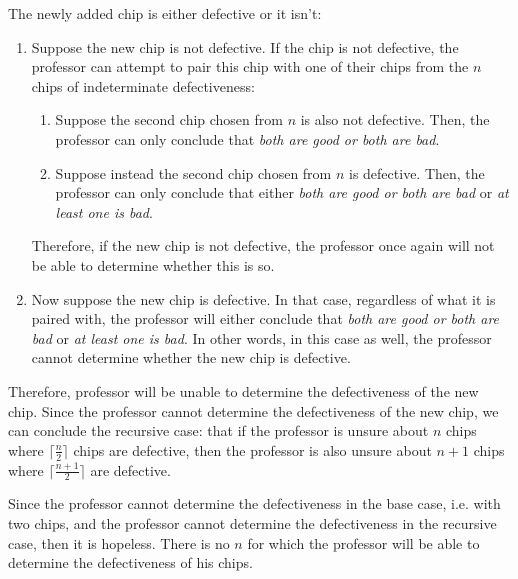 \documentclass[]{book}
\theoremstyle{definition}
\begin{document}
\begin{enumerate}[label=\alph*.]
\begin{itemize}
        The newly added chip is either defective or it isn't:
        \begin{enumerate}
            \item
            Suppose the new chip is not defective.
            If the chip is not defective, the professor can attempt to pair this chip with one of their
            chips from the $n$ chips of indeterminate defectiveness:
            \begin{enumerate}
                \item Suppose the second chip chosen from $n$ is also not defective. Then, the professor can
                only conclude that 
                \textit{both are good or both are bad}.
                \item Suppose instead the second chip chosen from $n$ is defective. Then, the professor can
                only conclude that either \textit{both are good or both are bad} or \textit{at least one is bad}.
            \end{enumerate}

            Therefore, if the new chip is not defective, the professor once again will not be able to determine
            whether this is so.

            \item Now suppose the new chip is defective. In that case, regardless of what it is paired with,
            the professor will either conclude that 
            \textit{both are good or both are bad} or \textit{at least one is bad}.
            In other words, in this case as well, the professor cannot determine whether the new chip
            is defective.
        \end{enumerate}

        Therefore, professor will be unable to determine the defectiveness of the new chip.
        Since the professor cannot determine the defectiveness of the new chip, we can conclude
        the recursive case: that if the professor is unsure about $n$ chips where 
        $\lceil \frac{n}{2} \rceil$ chips are defective, 
        then the professor is also unsure about $n+1$ chips 
        where $\lceil \frac{n+1}{2} \rceil$ are defective.
    
    \end{itemize}

    Since the professor cannot determine the defectiveness in the base case, i.e. with two chips,
    and the professor cannot determine the defectiveness in the recursive case, then it is hopeless.
    There is no $n$ for which the professor will be able to determine the defectiveness of his chips.


\end{enumerate}
\end{document}
